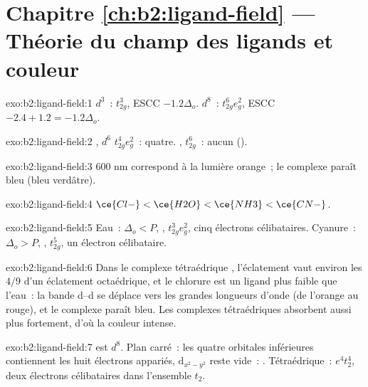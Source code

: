 \section*{Chapitre \ref{ch:b2:ligand-field} --- Théorie du champ des ligands et couleur}

\begin{solution}{exo:b2:ligand-field:1}
$d^3$~: $t_{2g}^3$, ESCC $-1.2\Delta_o$. $d^8$~: $t_{2g}^6e_g^2$, ESCC $-2.4 + 1.2 = -1.2\Delta_o$.
\end{solution}

\begin{solution}{exo:b2:ligand-field:2}
, $d^6$  $t_{2g}^4e_g^2$~: quatre. , 
$t_{2g}^6$~: aucun ().
\end{solution}

\begin{solution}{exo:b2:ligand-field:3}
600 nm correspond à la lumière orange~; le complexe paraît bleu (bleu verdâtre).
\end{solution}

\begin{solution}{exo:b2:ligand-field:4}
$\ce{Cl-} < \ce{H2O} < \ce{NH3} < \ce{CN-}$.
\end{solution}

\begin{solution}{exo:b2:ligand-field:5}
Eau~: $\Delta_o < P$, , $t_{2g}^3e_g^2$, cinq électrons célibataires. Cyanure~: $\Delta_o > P$,
, $t_{2g}^5$, un électron célibataire.
\end{solution}

\begin{solution}{exo:b2:ligand-field:6}
Dans le complexe tétraédrique , l'éclatement vaut environ les $4/9$ d'un éclatement octaédrique, et
le chlorure est un ligand plus faible que l'eau~: la bande d--d se déplace vers les grandes longueurs d'onde (de l'orange
au rouge), et le complexe paraît bleu. Les complexes tétraédriques absorbent aussi plus fortement,
d'où la couleur intense.
\end{solution}

\begin{solution}{exo:b2:ligand-field:7}
 est $d^8$. Plan carré~: les quatre orbitales inférieures contiennent les huit électrons appariés,
$\mathrm d_{x^2-y^2}$ reste vide~: . Tétraédrique~: $e^4t_2^4$, deux électrons célibataires
dans l'ensemble $t_2$.
\end{solution}

